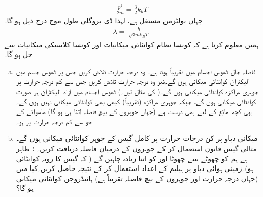 \begin{align*}
\frac{ p^2 }{ 2 m } = \frac{ 3 }{ 2 } k_b T
\end{align*}
جہاں  بولٹزمن مستقل ہے، لہٰذا ڈی بروگلی طول موج درج ذیل ہو گا۔
\begin{align*}
\lambda = \frac{ \hslash }{ \sqrt{ 3 m k_B T } }
\end{align*}
ہمیں معلوم کرنا ہے کہ کونسا نظام کوانٹائی میکانیات اور کونسا کلاسیکی میکانیات سے حل ہو گا۔ 
\begin{enumerate}[a.]
\item
{}\quad
 فاصلہ جال ٹھوس اجسام میں تقریباً  ہوتا ہے۔ وہ درجہ حرارت تلاش کریں جس پر ٹھوس جسم میں  الیکٹران کوانٹائی میکانی ہوں گے۔نیز وہ درجہ حرارت تلاش کریں جس سے کم درجہ حرارت پر جوہری مراکزہ کوانٹائی میکانی ہوں گے۔( کی مثال لیں۔) \quad 
ٹھوس اجسام میں آزاد الیکٹران ہر صورت کوانٹائی میکانی ہوں گے، جبکہ جوہری مراکزہ (تقریباً) کبھی بھی کوانٹائی میکانی نہیں ہوں گے۔ یہی کچھ مائع کے لیے بھی درست ہے (جہاں جوہروں کے بیچ فاصلہ اتنا ہی ہو گا) ماسوائے  کے جو  سے کم درجہ حرارت پر ہو۔
\item
{} میکانی دباو  پر کن درجات حرارت پر کامل گیس کے جوہر کوانٹائی میکانی ہوں گے۔  \quad
مثالی گیس قانون  استعمال کر کے جوہروں کے درمیان فاصلہ دریافت کریں۔ \quad
{}؛ ظاہر ہے ہم  کو چھوٹے سے چھوٹا اور  کو اتنا زیادہ چاہیں گے ( کہ گیس کا رویہ کوانٹائی ہو)۔زمینی ہوائی دباو پر ہیلیم کے اعداد استعمال کر کے نتیجہ حاصل کریں۔کیا  میں (جہاں درجہ حرارت  اور جوہروں کے بیچ فاصلہ تقریباً  ہے) ہائیڈروجن کوانٹائی میکانی ہو گا؟ 
\end{enumerate}
